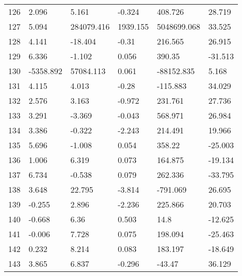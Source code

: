 \documentclass[11pt]{article}
\begin{document}
\begin{center}
\begin{longtable}{llllll}
        126 & 2.096      & 5.161                  & -0.324            & 408.726            & 28.719   \\
        127 & 5.094      & 284079.416             & 1939.155          & 5048699.068        & 33.525   \\
        128 & 4.141      & -18.404                & -0.31             & 216.565            & 26.915   \\
        129 & 6.336      & -1.102                 & 0.056             & 390.35             & -31.513  \\
        130 & -5358.892  & 57084.113              & 0.061             & -88152.835         & 5.168    \\
        131 & 4.115      & 4.013                  & -0.28             & -115.883           & 34.029   \\
        132 & 2.576      & 3.163                  & -0.972            & 231.761            & 27.736   \\
        133 & 3.291      & -3.369                 & -0.043            & 568.971            & 26.984   \\
        134 & 3.386      & -0.322                 & -2.243            & 214.491            & 19.966   \\
        135 & 5.696      & -1.008                 & 0.054             & 358.22             & -25.003  \\
        136 & 1.006      & 6.319                  & 0.073             & 164.875            & -19.134  \\
        137 & 6.734      & -0.538                 & 0.079             & 262.336            & -33.795  \\
        138 & 3.648      & 22.795                 & -3.814            & -791.069           & 26.695   \\
        139 & -0.255     & 2.896                  & -2.236            & 225.866            & 20.703   \\
        140 & -0.668     & 6.36                   & 0.503             & 14.8               & -12.625  \\
        141 & -0.006     & 7.728                  & 0.075             & 198.094            & -25.463  \\
        142 & 0.232      & 8.214                  & 0.083             & 183.197            & -18.649  \\
        143 & 3.865      & 6.837                  & -0.296            & -43.47             & 36.129   \\

\end{longtable}
\end{center}
\end{document}
